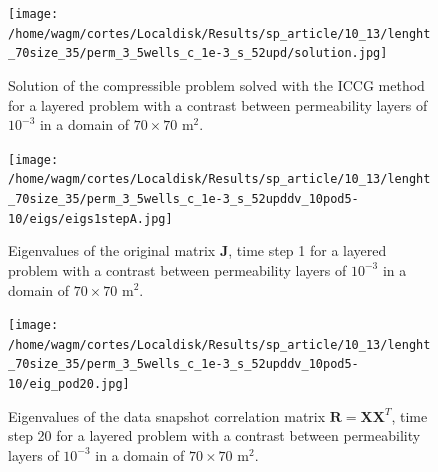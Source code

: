 \documentclass[12pt]{article}
\begin{document}
\begin{figure}[!h]
\centering
\begin{minipage}{.7\textwidth}
 \centering
\texttt{[image: /home/wagm/cortes/Localdisk/Results/sp\_article/10\_13/lenght\_70size\_35/perm\_3\_5wells\_c\_1e-3\_s\_52upd/solution.jpg]}
\caption{Solution of the compressible problem solved with the ICCG method for a layered problem with a contrast between permeability layers of $10^{-3}$ in a domain of $70 \times 70$ m$^2$.}
\label{fig:compsol_3}
\end{minipage}
\end{figure}

\begin{figure}[!h]
\centering
\begin{minipage}{.4\textwidth}
 \centering
 \vspace{-3mm}
\texttt{[image: /home/wagm/cortes/Localdisk/Results/sp\_article/10\_13/lenght\_70size\_35/perm\_3\_5wells\_c\_1e-3\_s\_52upddv\_10pod5-10/eigs/eigs1stepA.jpg]}
 \vspace{-10pt}
\caption{Eigenvalues of the original matrix $\mathbf{J}$, time step 1 for a layered problem with a contrast between permeability layers of $10^{-3}$ in a domain of $70 \times 70$ m$^2$.}\label{fig:eigs_A_3}
\end{minipage}%
\hspace{1cm}
\begin{minipage}{.4\textwidth}
 \centering
\texttt{[image: /home/wagm/cortes/Localdisk/Results/sp\_article/10\_13/lenght\_70size\_35/perm\_3\_5wells\_c\_1e-3\_s\_52upddv\_10pod5-10/eig\_pod20.jpg]}
\caption{Eigenvalues of the data snapshot correlation matrix $\mathbf{R}=\mathbf{X}\mathbf{X}^T$, time step 20 for a layered problem with a contrast between permeability layers of $10^{-3}$ in a domain of $70 \times 70$ m$^2$.}
\label{fig:eig_POD_3}
\end{minipage}
\end{figure}
\end{document}
